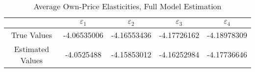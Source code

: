 
\begin{table}
\centering
\begin{tabular}{ |c|c|c|c|c| }
\hline
 & $\varepsilon_1$ &   $\varepsilon_2$ &  $\varepsilon_3$ &  $\varepsilon_4$ \\
 \hline
 True Values & -4.06535006 & -4.16553436 & -4.17726162 & -4.18978309  \\
 \hline
Estimated Values & -4.0525488 & -4.15853012 & -4.16252984 & -4.17736646 \\
 \hline
\end{tabular}
\label{table5_3}
\caption{Average Own-Price Elasticities, Full Model Estimation}
\end{table}
